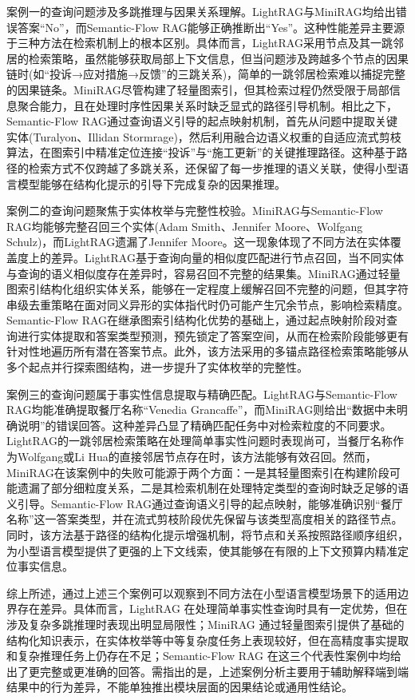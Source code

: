 \documentclass[promaster, vlined]{DissertUESTC}
\begin{document}
案例一的查询问题涉及多跳推理与因果关系理解。LightRAG与MiniRAG均给出错误答案“No”，而Semantic-Flow RAG能够正确推断出“Yes”。这种性能差异主要源于三种方法在检索机制上的根本区别。具体而言，LightRAG采用节点及其一跳邻居的检索策略，虽然能够获取局部上下文信息，但当问题涉及跨越多个节点的因果链时(如“投诉→应对措施→反馈”的三跳关系)，简单的一跳邻居检索难以捕捉完整的因果链条。MiniRAG尽管构建了轻量图索引，但其检索过程仍然受限于局部信息聚合能力，且在处理时序性因果关系时缺乏显式的路径引导机制。相比之下，Semantic-Flow RAG通过查询语义引导的起点映射机制，首先从问题中提取关键实体(Turalyon、Illidan Stormrage)，然后利用融合边语义权重的自适应流式剪枝算法，在图索引中精准定位连接“投诉”与“施工更新”的关键推理路径。这种基于路径的检索方式不仅跨越了多跳关系，还保留了每一步推理的语义关联，使得小型语言模型能够在结构化提示的引导下完成复杂的因果推理。

案例二的查询问题聚焦于实体枚举与完整性校验。MiniRAG与Semantic-Flow RAG均能够完整召回三个实体(Adam Smith、Jennifer Moore、Wolfgang Schulz)，而LightRAG遗漏了Jennifer Moore。这一现象体现了不同方法在实体覆盖度上的差异。LightRAG基于查询向量的相似度匹配进行节点召回，当不同实体与查询的语义相似度存在差异时，容易召回不完整的结果集。MiniRAG通过轻量图索引结构化组织实体关系，能够在一定程度上缓解召回不完整的问题，但其字符串级去重策略在面对同义异形的实体指代时仍可能产生冗余节点，影响检索精度。Semantic-Flow RAG在继承图索引结构化优势的基础上，通过起点映射阶段对查询进行实体提取和答案类型预测，预先锁定了答案空间，从而在检索阶段能够更有针对性地遍历所有潜在答案节点。此外，该方法采用的多锚点路径检索策略能够从多个起点并行探索图结构，进一步提升了实体枚举的完整性。

案例三的查询问题属于事实性信息提取与精确匹配。LightRAG与Semantic-Flow RAG均能准确提取餐厅名称“Venedia Grancaffe”，而MiniRAG则给出“数据中未明确说明”的错误回答。这种差异凸显了精确匹配任务中对检索粒度的不同要求。LightRAG的一跳邻居检索策略在处理简单事实性问题时表现尚可，当餐厅名称作为Wolfgang或Li Hua的直接邻居节点存在时，该方法能够有效召回。然而，MiniRAG在该案例中的失败可能源于两个方面：一是其轻量图索引在构建阶段可能遗漏了部分细粒度关系，二是其检索机制在处理特定类型的查询时缺乏足够的语义引导。Semantic-Flow RAG通过查询语义引导的起点映射，能够准确识别“餐厅名称”这一答案类型，并在流式剪枝阶段优先保留与该类型高度相关的路径节点。同时，该方法基于路径的结构化提示增强机制，将节点和关系按照路径顺序组织，为小型语言模型提供了更强的上下文线索，使其能够在有限的上下文预算内精准定位事实信息。

综上所述，通过上述三个案例可以观察到不同方法在小型语言模型场景下的适用边界存在差异。具体而言，LightRAG 在处理简单事实性查询时具有一定优势，但在涉及复杂多跳推理时表现出明显局限性；MiniRAG 通过轻量图索引提供了基础的结构化知识表示，在实体枚举等中等复杂度任务上表现较好，但在高精度事实提取和复杂推理任务上仍存在不足；Semantic-Flow RAG 在这三个代表性案例中均给出了更完整或更准确的回答。需指出的是，上述案例分析主要用于辅助解释端到端结果中的行为差异，不能单独推出模块层面的因果结论或通用性结论。
\end{document}
